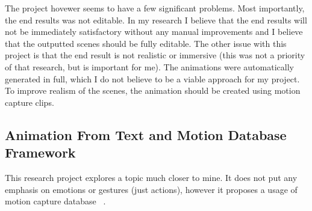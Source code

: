 The project hovewer seems to have a few significant problems. Most importantly, the end results was not editable. In my research I believe that the end results will not be immediately satisfactory without any manual improvements and I believe that the outputted scenes should be fully editable. The other issue with this project is that the end result is not realistic or immersive (this was not a priority of that research, but is important for me). The animations were automatically generated in full, which I do not believe to be a viable approach for my project. To improve realism of the scenes, the animation should be created using motion capture clips.

\subsection{Animation From Text and Motion Database Framework}
This research project explores a topic much closer to mine. It does not put any emphasis on emotions or gestures (just actions), however it proposes a usage of motion capture database ~\cite{animmc}.





